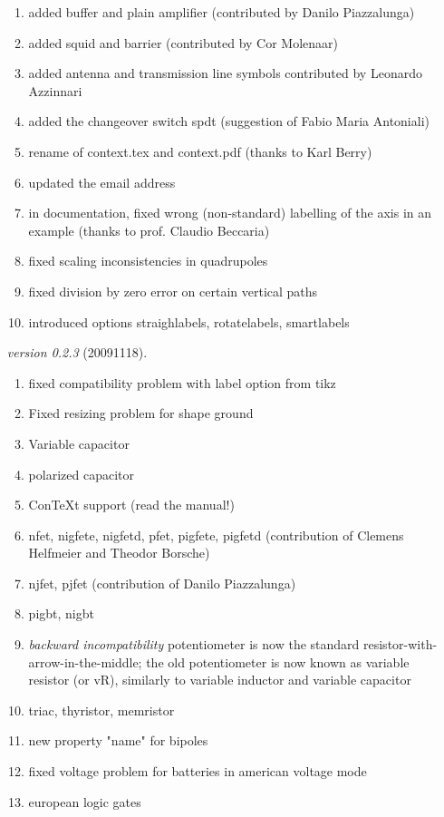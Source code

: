 \documentclass[a4paper]{article}
\begin{document}
\begin{itemize}
\begin{enumerate}
	\item added buffer and plain amplifier (contributed by Danilo Piazzalunga)
	\item added squid and barrier (contributed by  Cor Molenaar)
	\item added antenna and transmission line symbols contributed by Leonardo Azzinnari
	\item added the changeover switch spdt (suggestion of Fabio Maria Antoniali)
	\item rename of context.tex and context.pdf (thanks to Karl Berry)
	\item updated the email address
    \item in documentation, fixed wrong (non-standard) labelling of the axis in an example (thanks to prof. Claudio Beccaria)
    \item fixed scaling inconsistencies in quadrupoles    
    \item fixed division by zero error on certain vertical paths
    \item introduced options straighlabels, rotatelabels, smartlabels
    \end{enumerate}
\item[\itshape version 0.2.3]  (20091118).
   \begin{enumerate}
	\item fixed compatibility problem with label option from tikz
	\item Fixed resizing problem for shape ground
	\item Variable capacitor
	\item polarized capacitor
	\item ConTeXt support (read the manual!)
	\item nfet, nigfete, nigfetd, pfet, pigfete, pigfetd (contribution of Clemens Helfmeier and Theodor 
Borsche)
	\item njfet, pjfet (contribution of Danilo Piazzalunga)
	\item pigbt, nigbt
	\item \emph{backward incompatibility} potentiometer is now the standard resistor-with-arrow-in-the-middle; the old potentiometer is now known as variable resistor (or vR), similarly to variable inductor and variable capacitor
	\item triac, thyristor, memristor
	\item new property "name" for bipoles
	\item fixed voltage problem for batteries in american voltage mode
	\item european logic gates

\end{enumerate}
\end{itemize}
\end{document}
